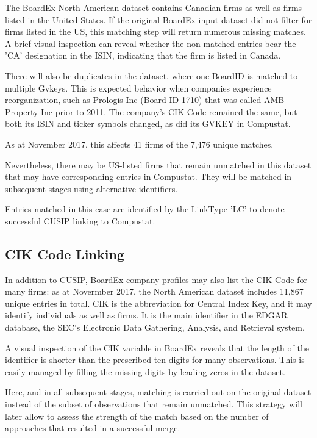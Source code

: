 \documentclass[12pt]{article}
\begin{document}
The BoardEx North American dataset contains Canadian firms as well as firms listed in the United States.
If the original BoardEx input dataset did not filter for firms listed in the US, this matching step will return numerous missing matches.
A brief visual inspection can reveal whether the non-matched entries bear the 'CA' designation in the ISIN, indicating that the firm is listed in Canada.

There will also be duplicates in the dataset, where one BoardID is matched to multiple Gvkeys.
This is expected behavior when companies experience reorganization, such as Prologis Inc (Board ID 1710) that was called AMB Property Inc prior to 2011.
The company's CIK Code remained the same, but both its ISIN and ticker symbols changed, as did its GVKEY in Compustat.

\begin{center}

\end{center}

As at November 2017, this affects 41 firms of the 7,476 unique matches.

Nevertheless, there may be US-listed firms that remain unmatched in this dataset that may have corresponding entries in Compustat.
They will be matched in subsequent stages using alternative identifiers.

Entries matched in this case are identified by the LinkType 'LC' to denote successful CUSIP linking to Compustat.

\subsection{CIK Code Linking}\label{sec:CIKmatch}

In addition to CUSIP, BoardEx company profiles may also list the CIK Code for many firms: as at Novermber 2017, the North American dataset includes 11,867 unique entries in total.
CIK is the abbreviation for Central Index Key, and it may identify individuals as well as firms.
It is the main identifier in the EDGAR database, the SEC's Electronic Data Gathering, Analysis, and Retrieval system.

A visual inspection of the CIK variable in BoardEx reveals that the length of the identifier is shorter than the prescribed ten digits for many observations.
This is easily managed by filling the missing digits by leading zeros in the dataset.

Here, and in all subsequent stages, matching is carried out on the original dataset instead of the subset of observations that remain unmatched.
This strategy will later allow to assess the strength of the match based on the number of approaches that resulted in a successful merge.
\end{document}
